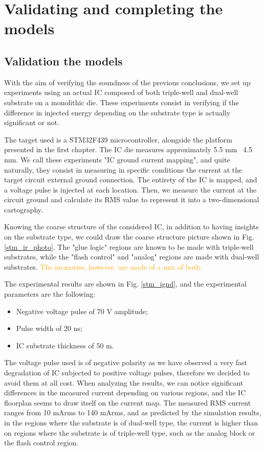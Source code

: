 
\section{Validating and completing the models}
\subsection{Validation the models}
	With the aim of verifying the soundness of the previous conclusions, we set up experiments using an actual IC composed of both triple-well and dual-well substrate on a monolithic die.
	These experiments consist in verifying if the difference in injected energy depending on the substrate type is actually significant or not.
	
	The target used is a STM32F439 microcontroller, alongside the platform presented in the first chapter.
	The IC die measures approximately 5.5 mm \texttimes\ 4.5 mm.
	We call these experiments "IC ground current mapping", and quite naturally, they consist in measuring in specific conditions the current at the target circuit external ground connection.
	The entirety of the IC is mapped, and a voltage pulse is injected at each location.
	Then, we measure the current at the circuit ground and calculate its RMS value to represent it into a two-dimensional cartography.
	
	Knowing the coarse structure of the considered IC, in addition to having insights on the substrate type, we could draw the coarse structure picture shown in Fig. \ref{stm_ir_photo}.
	The "glue logic" regions are known to be made with triple-well substrates, while the "flash control" and "analog" regions are made with dual-well substrates.
	\textcolor{orange}{The memories, however, are made of a mix of both.}
	
	The experimental results are shown in Fig. \ref{stm_ignd}, and the experimental parameters are the following:
	\begin{itemize}
		\item Negative voltage pulse of 70 V amplitude;
		\item Pulse width of 20 ns;
		\item IC substrate thickness of 50 \textmu m.
	\end{itemize}
	The voltage pulse used is of negative polarity as we have observed a very fast degradation of IC subjected to positive voltage pulses, therefore we decided to avoid them at all cost.
	When analyzing the results, we can notice significant differences in the measured current depending on various regions, and the IC floorplan seems to draw itself on the current map.
	The measured RMS current ranges from 10 mArms to 140 mArms, and as predicted by the simulation results, in the regions where the substrate is of dual-well type, the current is higher than on regions where the substrate is of triple-well type, such as the analog block or the flash control region.
	
